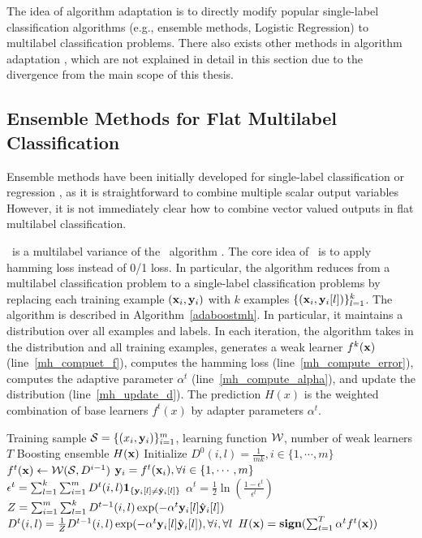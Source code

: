 {The idea of algorithm adaptation is to directly modify popular single-label classification algorithms (e.g., ensemble methods, Logistic Regression) to multilabel classification problems.
There also exists other methods in algorithm adaptation \citep{Crammer03afamily, Zhang06multilabel}, which are not explained in detail in this section due to the divergence from the main scope of this thesis.



%
%
\subsection{Ensemble Methods for Flat Multilabel Classification} \label{sc_emfmlc}

Ensemble methods have been initially developed for single-label classification \citep{Breiman96bagging,Freund97a} or regression \citep{Breiman96bagging}, as it is straightforward to combine multiple scalar output variables
However, it is not immediately clear how to combine vector valued outputs in flat multilabel classification.

\adaboostmh\ is a multilabel variance of the \adaboost\ algorithm \citep{Schapire99improved,Esuli2008boosting}.
The core idea of \adaboostmh\ is to apply hamming loss instead of 0/1 loss. 
In particular, the algorithm reduces from a multilabel classification problem to a single-label classification problems by replacing each training example $(\mathbf {x}_i,\mathbf {y}_i)$ with $k$ examples $\{(\mathbf {x}_i,\mathbf {y}_i[l])\}_{l=1}^k$.
The algorithm is described in Algorithm~\ref{adaboostmh}.
In particular, it maintains a distribution over all examples and labels.
In each iteration, the algorithm takes in the distribution and all training examples, generates a weak learner $f^k(\mathbf {x})$ (line~\ref{mh_compuet_f}), computes the hamming loss (line~\ref{mh_compute_error}), computes the adaptive parameter $\alpha^t$ (line~\ref{mh_compute_alpha}), and update the distribution (line~\ref{mh_update_d}).
The prediction $H(x)$ is the weighted combination of base learners $f^t(x)$ by adapter parameters $\alpha^t$.
\begin{algorithm}
\caption{\adaboostmh}
\label{adaboostmh}
\begin{algorithmic}[1]
	\REQUIRE Training sample $\mathcal{S} = \{(x_i,\mathbf {y}_i)\}_{i=1}^m$, learning function $\mathcal{W}$, number of weak learners $T$
	\ENSURE Boosting ensemble $H(\mathbf {x})$
	\STATE Initialize $D^0(i,l)=\frac{1}{mk},i\in\{1,\cdots,m\}$
		\STATE $f^t(\mathbf {x})\leftarrow\mathcal{W}(\mathcal{S},D^{i-1})$ \label{mh_compuet_f}
		\STATE $\mathbf {y}_i = f^t(\mathbf {x}_i),\forall i\in\{1,\cdots,m\}$
		\STATE $\epsilon^t =\sum_{l=1}^k\sum_{i=1}^{m}D^t(i,l)\mathbf{1}_{\{\mathbf {y}_i[l]\neq\hat{\mathbf {y}}_i[l]\}}$ \label{mh_compute_error}
		\STATE $\alpha^{t} = \frac{1}{2}\ln\left(\frac{1-\epsilon^t}{\epsilon^t}\right)$ \label{mh_compute_alpha}
		\STATE $Z=\sum_{i=1}^{m}\sum_{l=1}^{k}D^{t-1}(i,l)\exp(-\alpha^t\mathbf {y}_i[l]\hat{\mathbf {y}}_i[l])$
		\STATE $D^t(i,l) = \frac{1}{Z}D^{t-1}(i,l)\exp(-\alpha^t\mathbf {y}_i[l]\hat{\mathbf {y}}_i[l]),\forall i,\forall l$ \label{mh_update_d}
	\ENDFOR
	\RETURN $H(\mathbf {x}) = \textbf{sign}(\sum_{t=1}^T\alpha^tf^t(\mathbf {x}))$
\end{algorithmic}
\end{algorithm}

}

